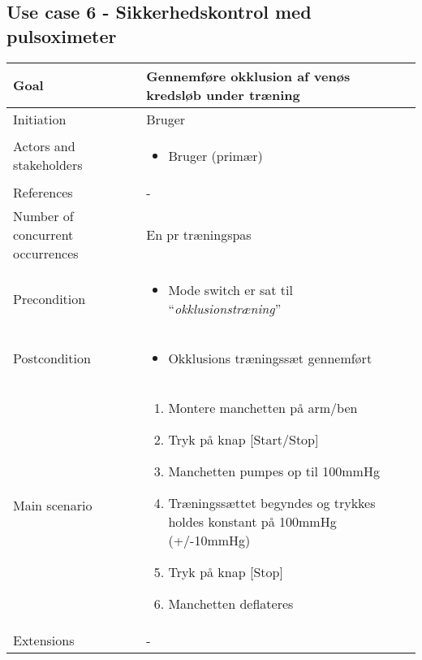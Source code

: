	\subsection{Use case 6 - Sikkerhedskontrol med pulsoximeter}
		\begin{center}
			\begin{tabular}{ | m{4cm} | m{8cm}| } 
				\hline
				Goal& Gennemføre okklusion af venøs kredsløb under træning  \\ 
				\hline
				Initiation &  Bruger\\
				\hline
				Actors and stakeholders & 
				\begin{itemize}
					\item Bruger (primær)
				\end{itemize} \\ 
				\hline
				References & - \\ 
				\hline
				Number of concurrent occurrences & En pr træningspas \\ 
				\hline	
				Precondition & 
				\begin{itemize}
					\item Mode switch er sat til  “\textit{okklusionstræning}”
 				\end{itemize} \\ 
				\hline
				Postcondition & 
				\begin{itemize}
					\item Okklusions træningssæt gennemført
				\end{itemize} \\ 
				\hline
				Main scenario & \begin{enumerate}
					\setlength\itemsep{0cm} %
					\item Montere manchetten på arm/ben
					\item Tryk på knap [Start/Stop]
					\item Manchetten pumpes op til 100mmHg
					\item Træningssættet begyndes og trykkes holdes konstant på 100mmHg (+/-10mmHg)
					\item Tryk på knap [Stop]
					\item Manchetten deflateres
				\end{enumerate} \\ 
				\hline
				Extensions & - \\ 
				\hline
			\end{tabular}
		\end{center}
	\pagebreak
		